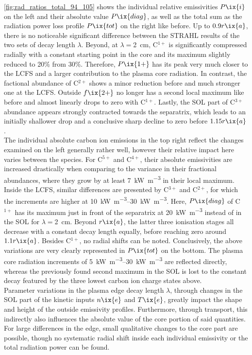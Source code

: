 %
            \cref{fig:rad_ratios_total_94_105} shows the individual relative emissivities $P\ix{i}$ on the left and their absolute value $P\ix{diag}$, as well as the total sum as the radiation power loss profile $P\ix{tot}$ on the right like before. Up to $0.9r\ix{a}$, there is no noticeable significant difference between the STRAHL results of the two sets of decay length $\lambda$. Beyond, at $\lambda=$\SI{2}{\centi\meter}, C$^{1+}$ is significantly compressed radially with a constant starting point in the core and its maximum slightly reduced to 20\% from 30\%. Therefore, $P\ix{1+}$ has its peak very much closer to the LCFS and a larger contribution to the plasma core radiation. In contrast, the factional abundance of C$^{2+}$ shows a minor reduction before and much stronger one at the LCFS. Outside  $f\ix{2+}$ no longer has a second local maximum like before and almost linearly drops to zero with C$^{1+}$. Lastly, the SOL part of C$^{3+}$ abundance appears strongly contracted towards the separatrix, which leads to an initially shallower drop and a conclusive sharp decline to zero before $1.15r\ix{a}$.\\%
            The individual absolute carbon ion emissions in the top right reflect the changes examined on the left generally rather well, however their relative impact here varies between the species. For C$^{5+}$ and C$^{4+}$, their absolute emissivities are increased drastically when comparing to the variance in their fractional abundances, where they grow by at least \SI{7}{\kilo\watt\per\cubic\meter} in their local maximum. Inside the LCFS, similar differences are presented by C$^{3+}$ and C$^{2+}$, for which the increments are higher at \SIrange{10}{30}{\kilo\watt\per\cubic\meter}. Here, $P\ix{diag}$ of C$^{1+}$ has its maximum just in front of the separatrix at \SI{20}{\kilo\watt\per\cubic\meter} instead of in the SOL for $\lambda=$\SI{2}{\centi\meter}. Beyond $r\ix{a}$, the latter three ionisation stages all decrease with a constant decay length equally, before reaching zero around $1.1r\ix{a}$. Besides C$^{1+}$, no radial shifts can be noted. Conclusively, the above variations are very clearly represented in $P\ix{tot}$ on the bottom. The plasma core radiation increments of \SIrange{5}{30}{\kilo\watt\per\cubic\meter} are reflected directly, whereas the previously found second maximum in the SOL is lost to the constant decay featured by the three lowest carbon ion charge states above.\\%
            Parameter variations in the plasma edge decay length $\lambda$, through changes in the SOL part of the kinetic inputs $n\ix{e}$ and $T\ix{e}$, greatly impact the shape and height of the outside emissivity profiles. Furthermore, through transport, this indirectly also influences the absolute value of the core portion of said quantities. For large differences in the edge, small qualitative changes to the core part are possible, though no systematic radial shift inside each individual emissivity or the total radiation power can be found.%
%
